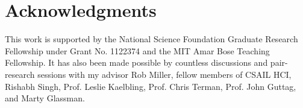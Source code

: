 \documentclass[12pt]{article}
\newcommand\codevar[1]{\texttt{#1}}
\begin{document}
\section{Acknowledgments}
This work is supported by the National Science Foundation Graduate Research Fellowship under Grant No. 1122374 and the MIT Amar Bose Teaching Fellowship. It has also been made possible by countless discussions and pair-research sessions with my advisor Rob Miller, fellow members of CSAIL HCI, Rishabh Singh, Prof. Leslie Kaelbling, Prof. Chris Terman, Prof. John Guttag, and Marty Glassman.

\end{document}
